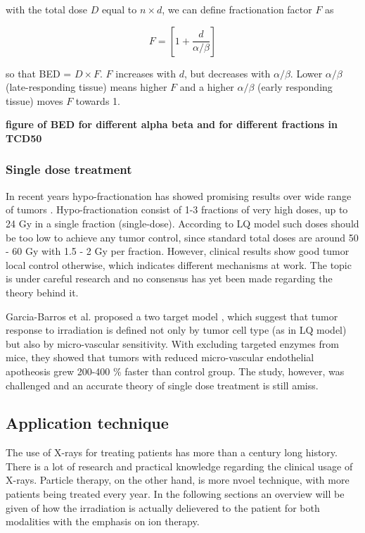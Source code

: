\documentclass[type=dr, dr=rernat, accentcolor=tud7b,colorbacktitle, bigchapter, openright, twoside, 12pt ]{tudthesis}
\begin{document}
with the total dose $D$ equal to $n \times d$, we can define fractionation factor $F$ as

\begin{equation}
 F = \left[1 + \frac{d}{\alpha / \beta} \right]
\end{equation}

so that BED = $D \times F$. $F$ increases with $d$, but decreases with $\alpha / \beta$. Lower $\alpha / \beta$ (late-responding tissue)
means higher $F$ and a higher $\alpha / \beta$ (early responding tissue) moves $F$ towards 1.

\textbf{figure of BED for different alpha beta and for different fractions in TCD50}


\subsubsection{Single dose treatment}

In recent years hypo-fractionation has showed promising results over wide range of tumors \cite{Yamada2008, Greco2011, Halasz2013}. 
Hypo-fractionation consist of 1-3 fractions of very high doses, up to 24 Gy in a single fraction (single-dose). According to LQ model such doses should be too low to achieve any tumor control, since standard total doses are around 50 - 60 Gy with 1.5 - 2 Gy per fraction. 
However, clinical results show good tumor local control otherwise, which indicates different mechanisms at work. The topic is under careful research and no consensus has yet been made regarding the theory behind it.

Garcia-Barros et al. proposed a two target model \cite{Garcia2003}, which suggest that tumor response to irradiation is defined not only by tumor cell type (as in LQ model) but also by micro-vascular
sensitivity. With excluding targeted enzymes from mice, they showed that tumors with reduced micro-vascular endothelial apotheosis grew 200-400 \% faster than control group. The study, however, was challenged
and an accurate theory of single dose treatment is still amiss.
  

\subsection{Application technique}

The use of X-rays for treating patients has more than a century long history. There is a lot of research and practical knowledge regarding the clinical usage of X-rays. Particle therapy, on the other hand, is more nvoel technique, with
more patients being treated every year. In the following sections an overview will be given of how the irradiation is actually delievered to the patient for both modalities with the emphasis on ion therapy.
\end{document}
